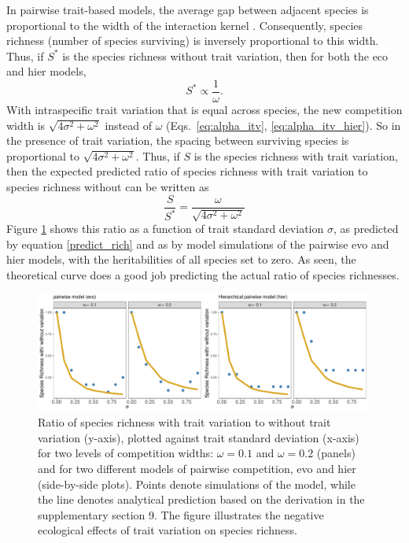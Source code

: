 \documentclass[10pt]{article}
\begin{document}
In pairwise trait-based models, the average gap between adjacent species is proportional to the width of the interaction kernel \citep{macarthur_limiting_1967, szabo_limiting_2006, barabas_when_2009, barabas_continuous_2012, dandrea_revising_2013, barabas_effect_2016}. Consequently, species richness (number of species surviving) is inversely proportional to this width. Thus, if $S^{*}$ is the species richness without trait variation, then for both the eco and hier models,
\begin{equation}
  S^{*}
  \propto \frac{1}{\omega} .
\end{equation}
With intraspecific trait variation that is equal across species, the new competition width is $\sqrt{4\sigma^2+\omega^2}$ instead of $\omega$ (Eqs.~\ref{eq:alpha_itv}, \ref{eq:alpha_itv_hier}). So in the presence of trait variation, the spacing between surviving species is proportional to $\sqrt{4\sigma^2+\omega^2}$. Thus, if $S$ is the species richness with trait variation, then the expected predicted ratio of species richness with trait variation to species richness without can be written as
\begin{equation}
  \label{predict_rich}
  \frac{S}{S^{*}}
  = \frac{\omega}{\sqrt{4\sigma^2+\omega^2}}
\end{equation}
Figure \ref{fig:richness_itv} shows this ratio as a function of trait standard deviation $\sigma$, as predicted by equation \ref{predict_rich} and as by model simulations of the pairwise evo and hier models, with the heritabilities of all species set to zero. As seen, the theoretical curve does a good job predicting the actual ratio of species richnesses.

\begin{figure}[!ht]
  \centering
  \includegraphics[width=0.99\textwidth]{richness_itv_no_itv.pdf}
  \caption{Ratio of species richness with trait variation to without trait variation (y-axis), plotted against trait standard deviation (x-axis) for two levels of competition widths: $\omega=0.1$ and $\omega = 0.2$ (panels) and for two different models of pairwise competition, evo and hier (side-by-side plots). Points denote simulations of the model, while the line denotes analytical prediction based on the derivation in the supplementary section 9. The figure illustrates the negative ecological effects of trait variation on species richness.}
  \label{fig:richness_itv}
\end{figure}
\end{document}
